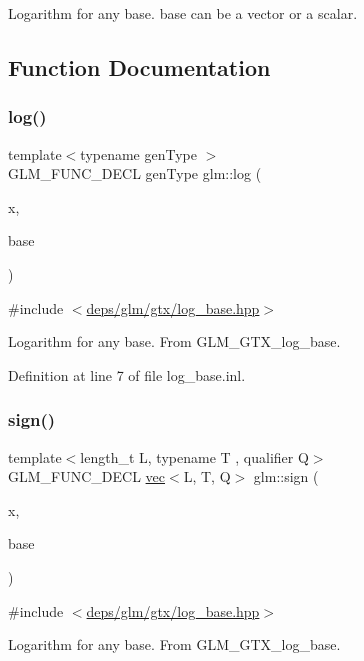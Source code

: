 Logarithm for any base. base can be a vector or a scalar. 

\subsection{Function Documentation}
\mbox{\label{group__gtx__log__base_ga60a7b0a401da660869946b2b77c710c9}} 
\subsubsection{\texorpdfstring{log()}{log()}}
{\footnotesize\ttfamily template$<$typename gen\+Type $>$ \\
G\+L\+M\+\_\+\+F\+U\+N\+C\+\_\+\+D\+E\+CL gen\+Type glm\+::log (\begin{DoxyParamCaption}\item[{gen\+Type const \&}]{x,  }\item[{gen\+Type const \&}]{base }\end{DoxyParamCaption})}



{\ttfamily \#include $<$\hyperlink{log__base_8hpp}{deps/glm/gtx/log\+\_\+base.\+hpp}$>$}

Logarithm for any base. From G\+L\+M\+\_\+\+G\+T\+X\+\_\+log\+\_\+base. 

Definition at line 7 of file log\+\_\+base.\+inl.

\mbox{\label{group__gtx__log__base_ga04ef803a24f3d4f8c67dbccb33b0fce0}} 
\subsubsection{\texorpdfstring{sign()}{sign()}}
{\footnotesize\ttfamily template$<$length\+\_\+t L, typename T , qualifier Q$>$ \\
G\+L\+M\+\_\+\+F\+U\+N\+C\+\_\+\+D\+E\+CL \hyperlink{structglm_1_1vec}{vec}$<$L, T, Q$>$ glm\+::sign (\begin{DoxyParamCaption}\item[{\hyperlink{structglm_1_1vec}{vec}$<$ L, T, Q $>$ const \&}]{x,  }\item[{\hyperlink{structglm_1_1vec}{vec}$<$ L, T, Q $>$ const \&}]{base }\end{DoxyParamCaption})}



{\ttfamily \#include $<$\hyperlink{log__base_8hpp}{deps/glm/gtx/log\+\_\+base.\+hpp}$>$}

Logarithm for any base. From G\+L\+M\+\_\+\+G\+T\+X\+\_\+log\+\_\+base. 
